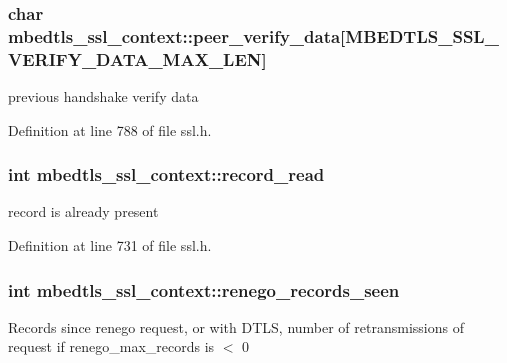 \hypertarget{structmbedtls__ssl__context_a75c8c793f5cff7b0892f0616a40cede7}{
\subsubsection[{peer\-\_\-verify\-\_\-data}]{\setlength{\rightskip}{0pt plus 5cm}char mbedtls\-\_\-ssl\-\_\-context\-::peer\-\_\-verify\-\_\-data\mbox{[}M\-B\-E\-D\-T\-L\-S\-\_\-\-S\-S\-L\-\_\-\-V\-E\-R\-I\-F\-Y\-\_\-\-D\-A\-T\-A\-\_\-\-M\-A\-X\-\_\-\-L\-E\-N\mbox{]}}}\label{structmbedtls__ssl__context_a75c8c793f5cff7b0892f0616a40cede7}
previous handshake verify data 

Definition at line 788 of file ssl.\-h.

\hypertarget{structmbedtls__ssl__context_adfba71d6f510182482d73cd8f1ffbccd}{
\subsubsection[{record\-\_\-read}]{\setlength{\rightskip}{0pt plus 5cm}int mbedtls\-\_\-ssl\-\_\-context\-::record\-\_\-read}}\label{structmbedtls__ssl__context_adfba71d6f510182482d73cd8f1ffbccd}
record is already present 

Definition at line 731 of file ssl.\-h.

\hypertarget{structmbedtls__ssl__context_aa735220d7fc72e44974f70f28fc70814}{
\subsubsection[{renego\-\_\-records\-\_\-seen}]{\setlength{\rightskip}{0pt plus 5cm}int mbedtls\-\_\-ssl\-\_\-context\-::renego\-\_\-records\-\_\-seen}}\label{structmbedtls__ssl__context_aa735220d7fc72e44974f70f28fc70814}
Records since renego request, or with D\-T\-L\-S, number of retransmissions of request if renego\-\_\-max\-\_\-records is $<$ 0 

